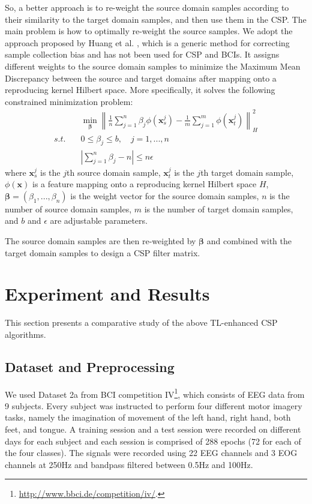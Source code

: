 \documentclass[runningheads]{llncs}
\begin{document}
So, a better approach is to re-weight the source domain samples according to their similarity to the target domain samples, and then use them in the CSP. The main problem is how to optimally re-weight the source samples. We adopt the approach proposed by Huang et al. \cite{Huang2006}, which is a generic method for correcting sample collection bias and has not been used for CSP and BCIs. It assigns different weights to the source domain samples to minimize the Maximum Mean Discrepancy \cite{Belkin2006} between the source and target domains after mapping onto a reproducing kernel Hilbert space. More specifically, it solves the following constrained minimization problem:
\begin{align}
 &\min\limits_{\boldsymbol{\beta}}\left\|\frac{1}{n}\sum_{j=1}^n\beta_j\phi(\mathbf{x}_s^j)
 -\frac{1}{m}\sum_{j=1}^m\phi(\mathbf{x}_t^j) \right\|_H^2 \label{eq:MMD}\\
 s.t. \quad & 0\le\beta_j\le b, \quad j=1,...,n \nonumber\\
 &\left|\sum_{j=1}^n\beta_j-n\right|\le n\epsilon \nonumber
\end{align}
where $\mathbf{x}_s^j$ is the $j$th source domain sample, $\mathbf{x}_t^j$ is the $j$th target domain sample, $\phi(\mathbf{x})$ is a feature mapping onto a reproducing kernel Hilbert space $H$, $\boldsymbol{\beta}=(\beta_1,...,\beta_n)$ is the weight vector for the source domain samples, $n$ is the number of source domain samples, $m$ is the number of target domain samples, and $b$ and $\epsilon$ are adjustable parameters.

The source domain samples are then re-weighted by $\boldsymbol{\beta}$ and combined with the target domain samples to design a CSP filter matrix.


\section{Experiment and Results} \label{sect:comp}

This section presents a comparative study of the above TL-enhanced CSP algorithms.

\subsection{Dataset and Preprocessing}

We used Dataset 2a from BCI competition IV\footnote{\href{http://www.bbci.de/competition/iv/}{http://www.bbci.de/competition/iv/}.}, which consists of EEG data from 9 subjects. Every subject was instructed to perform four different motor imagery tasks, namely the imagination of movement of the left hand, right hand, both feet, and tongue. A training session and a test session were recorded on different days for each subject and each session is comprised of 288 epochs (72 for each of the four classes). The signals were recorded using 22 EEG channels and 3 EOG channels at 250Hz and bandpass filtered between 0.5Hz and 100Hz.
\end{document}
